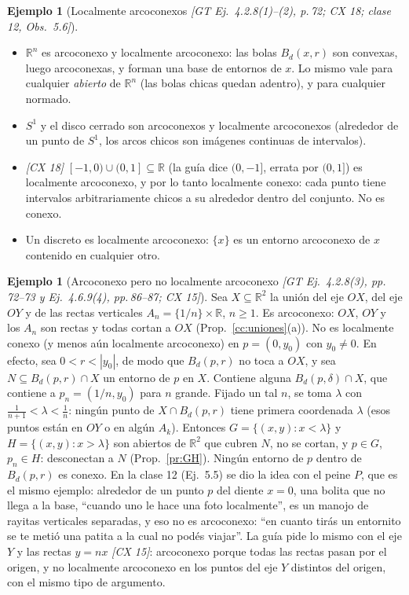 \documentclass[11pt,a4paper]{article}
\newenvironment{lista}{\leavevmode\begin{itemize}[leftmargin=1.5em,itemsep=1pt,topsep=2pt,parsep=0pt]}{\end{itemize}}
\theoremstyle{definition}
\newtheorem{ejemplo}[definicion]{Ejemplo}
\theoremstyle{plain}
\newcommand{\fnt}[1]{{\normalfont\small\itshape\color{gray!150!black}[#1]}}
\newcommand{\R}{\mathbb{R}}
\newcommand{\Bola}[2]{B_d(#1,#2)}
\begin{document}
\begin{ejemplo}[Localmente arcoconexos \fnt{GT Ej.\ 4.2.8(1)--(2), p.\,72; CX 18; clase 12, Obs.\ 5.6}]\label{cc:ejlocarco}
\begin{lista}
\item $\R^n$ es arcoconexo y localmente arcoconexo: las bolas $\Bola{x}{r}$ son convexas, luego arcoconexas, y forman una base de entornos de $x$. Lo mismo vale para cualquier \emph{abierto} de $\R^n$ (las bolas chicas quedan adentro), y para cualquier normado.
\item $S^1$ y el disco cerrado son arcoconexos y localmente arcoconexos (alrededor de un punto de $S^1$, los arcos chicos son imágenes continuas de intervalos).
\item \fnt{CX 18} $[-1,0)\cup(0,1]\subseteq\R$ (la guía dice $(0,-1]$, errata por $(0,1]$) es localmente arcoconexo, y por lo tanto localmente conexo: cada punto tiene intervalos arbitrariamente chicos a su alrededor dentro del conjunto. No es conexo.
\item Un discreto es localmente arcoconexo: $\{x\}$ es un entorno arcoconexo de $x$ contenido en cualquier otro.
\end{lista}
\end{ejemplo}

\begin{ejemplo}[Arcoconexo pero no localmente arcoconexo \fnt{GT Ej.\ 4.2.8(3), pp.\,72--73 y Ej.\ 4.6.9(4), pp.\,86--87; CX 15}]\label{cc:peinecompleto}
Sea $X\subseteq\R^2$ la unión del eje $OX$, del eje $OY$ y de las rectas verticales $A_n=\{1/n\}\times\R$, $n\ge1$. Es arcoconexo: $OX$, $OY$ y los $A_n$ son rectas y todas cortan a $OX$ (Prop.~\ref{cc:uniones}(a)). No es localmente conexo (y menos aún localmente arcoconexo) en $p=(0,y_0)$ con $y_0\ne0$. En efecto, sea $0<r<|y_0|$, de modo que $\Bola{p}{r}$ no toca a $OX$, y sea $N\subseteq\Bola{p}{r}\cap X$ un entorno de $p$ en $X$. Contiene alguna $\Bola{p}{\delta}\cap X$, que contiene a $p_n=(1/n,y_0)$ para $n$ grande. Fijado un tal $n$, se toma $\lambda$ con $\frac1{n+1}<\lambda<\frac1n$: ningún punto de $X\cap\Bola{p}{r}$ tiene primera coordenada $\lambda$ (esos puntos están en $OY$ o en algún $A_k$). Entonces $G=\{(x,y): x<\lambda\}$ y $H=\{(x,y): x>\lambda\}$ son abiertos de $\R^2$ que cubren $N$, no se cortan, y $p\in G$, $p_n\in H$: desconectan a $N$ (Prop.~\ref{pr:GH}). Ningún entorno de $p$ dentro de $\Bola{p}{r}$ es conexo. En la clase 12 (Ej.\ 5.5) se dio la idea con el peine $P$, que es el mismo ejemplo: alrededor de un punto $p$ del diente $x=0$, una bolita que no llega a la base, ``cuando uno le hace una foto localmente'', es un manojo de rayitas verticales separadas, y eso no es arcoconexo: ``en cuanto tirás un entornito se te metió una patita a la cual no podés viajar''.
La guía pide lo mismo con el eje $Y$ y las rectas $y=nx$ \fnt{CX 15}: arcoconexo porque todas las rectas pasan por el origen, y no localmente arcoconexo en los puntos del eje $Y$ distintos del origen, con el mismo tipo de argumento.
\end{ejemplo}
\end{document}
